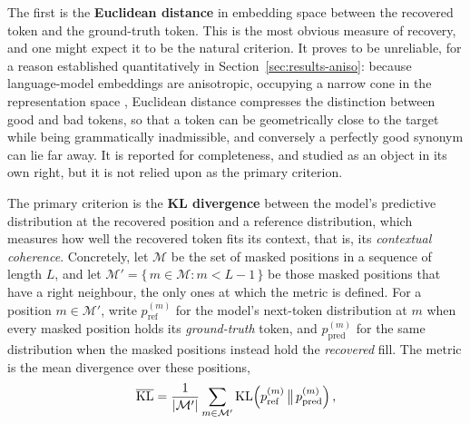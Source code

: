 The first is the \textbf{Euclidean distance} in embedding space between the recovered token and the ground-truth token. This is the most obvious measure of recovery, and one might expect it to be the natural criterion. It proves to be unreliable, for a reason established quantitatively in Section~\ref{sec:results-aniso}: because language-model embeddings are anisotropic, occupying a narrow cone in the representation space \citep{ethayarajh2019contextual}, Euclidean distance compresses the distinction between good and bad tokens, so that a token can be geometrically close to the target while being grammatically inadmissible, and conversely a perfectly good synonym can lie far away. It is reported for completeness, and studied as an object in its own right, but it is not relied upon as the primary criterion.

The primary criterion is the \textbf{KL divergence} \citep{kullback1951information} between the model's predictive distribution at the recovered position and a reference distribution, which measures how well the recovered token fits its context, that is, its \emph{contextual coherence}. Concretely, let $\mathcal{M}$ be the set of masked positions in a sequence of length $L$, and let $\mathcal{M}' = \{\, m \in \mathcal{M} : m < L-1 \,\}$ be those masked positions that have a right neighbour, the only ones at which the metric is defined. For a position $m \in \mathcal{M}'$, write $p^{(m)}_{\text{ref}}$ for the model's next-token distribution at $m$ when every masked position holds its \emph{ground-truth} token, and $p^{(m)}_{\text{pred}}$ for the same distribution when the masked positions instead hold the \emph{recovered} fill. The metric is the mean divergence over these positions,
\begin{equation}
    \overline{\operatorname{KL}} = \frac{1}{|\mathcal{M}'|} \sum_{m \in \mathcal{M}'} \operatorname{KL}\!\left(p^{(m)}_{\text{ref}} \,\big\|\, p^{(m)}_{\text{pred}}\right),
    \label{eq:meth-kl}
\end{equation}
